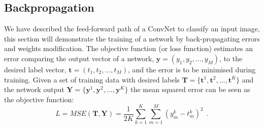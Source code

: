\subsection{Backpropagation}
We have described the feed-forward path of a ConvNet to classify an input image, this section will demonstrate the training of a network by back-propagating errors and weights modification.
The objective function (or loss function) estimates an error comparing the output vector of a network, $\mathbf{y}=(y_1,y_2,...,y_M)$, to the desired label vector, $\mathbf{t}=(t_1,t_2,...,t_M)$, and the error is to be minimised during training.
Given a set of training data with desired labels $\mathbf{T}=\{\mathbf{t}^1, \mathbf{t}^2, ..., \mathbf{t}^K\}$ and the network output $\mathbf{Y}=\{\mathbf{y}^1, \mathbf{y}^2, ..., \mathbf{y}^K\}$ the mean squared error can be seen as the objective function:  
\begin{equation}
L=MSE(\mathbf{T}, \mathbf{Y}) =\frac{1}{2K}\sum_{k=1}^K \sum_{m=1}^M (y^{k}_{m}-t^{k}_{m})^{2}~~.
\label{equ:loss_all}
\end{equation}

